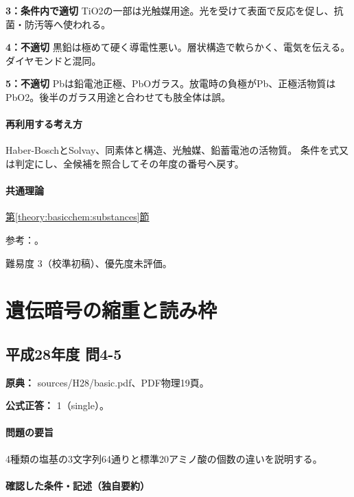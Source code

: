 \noindent\textbf{3：条件内で適切} TiO2の一部は光触媒用途。光を受けて表面で反応を促し、抗菌・防汚等へ使われる。\par

\noindent\textbf{4：不適切} 黒鉛は極めて硬く導電性悪い。層状構造で軟らかく、電気を伝える。ダイヤモンドと混同。\par

\noindent\textbf{5：不適切} Pbは鉛電池正極、PbOガラス。放電時の負極がPb、正極活物質はPbO2。後半のガラス用途と合わせても肢全体は誤。\par

\paragraph{再利用する考え方} Haber-BoschとSolvay、同素体と構造、光触媒、鉛蓄電池の活物質。 条件を式又は判定にし、全候補を照合してその年度の番号へ戻す。

\paragraph{共通理論} \hyperref[theory:basicchem:substances]{第\ref*{theory:basicchem:substances}節}

\par 参考：\cite{finish56_titania,openstax_batteries}。

\par 難易度 3（校準初稿）、優先度未評価。

\section{遺伝暗号の縮重と読み枠}

\subsection{平成28年度 問4-5}
\label{q:h28-reg-basic-4-5}

\noindent\textbf{原典：} sources/H28/basic.pdf、PDF物理19頁。

\textbf{公式正答：} 1（single）。

\paragraph{問題の要旨} 4種類の塩基の3文字列64通りと標準20アミノ酸の個数の違いを説明する。

\paragraph{確認した条件・記述（独自要約）}\mbox{}\par

